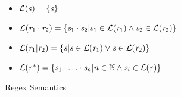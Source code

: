 \begin{figure}

\begin{itemize}
\item $\mathcal{L}{}(\mathit{s})=\{\mathit{s}\}$
\item $\mathcal{L}{}(\mathit{r}_1\cdot\mathit{r}_2) =
\{\mathit{s}_1\cdot\mathit{s}_2 | \mathit{s}_1\in\mathcal{L}{}(\mathit{r}_1) \wedge \mathit{s}_2\in\mathcal{L}{}(\mathit{r}_2)\}$
\item $\mathcal{L}{}(\mathit{r}_1|\mathit{r}_2) =
\{\mathit{s} | \mathit{s}\in\mathcal{L}{}(\mathit{r}_1) \vee \mathit{s}\in\mathcal{L}{}(\mathit{r}_2)\}$
\item $\mathcal{L}{}(\mathit{r}^*) =
\{\mathit{s}_1\cdot\ldots\cdot\mathit{s}_n | n\in\mathbb{N} \wedge \mathit{s}_i\in\mathcal{L}{}(\mathit{r})\}$

\end{itemize}
\caption{Regex Semantics }
\label{fig:regex-semantics}
\end{figure}
